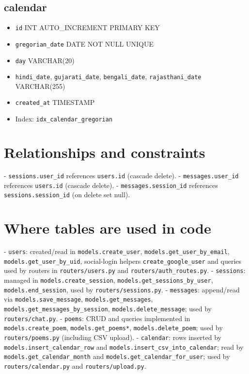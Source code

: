 \subsection*{calendar}
\begin{itemize}
  \item \texttt{id} INT AUTO\_INCREMENT PRIMARY KEY
  \item \texttt{gregorian\_date} DATE NOT NULL UNIQUE
  \item \texttt{day} VARCHAR(20)
  \item \texttt{hindi\_date}, \texttt{gujarati\_date}, \texttt{bengali\_date}, \texttt{rajasthani\_date} VARCHAR(255)
  \item \texttt{created\_at} TIMESTAMP
  \item Index: \texttt{idx\_calendar\_gregorian}
\end{itemize}

\section*{Relationships and constraints}
- \texttt{sessions.user\_id} references \texttt{users.id} (cascade delete).
- \texttt{messages.user\_id} references \texttt{users.id} (cascade delete).
- \texttt{messages.session\_id} references \texttt{sessions.session\_id} (on delete set null).

\section*{Where tables are used in code}
- \texttt{users}: created/read in \texttt{models.create\_user}, \texttt{models.get\_user\_by\_email}, \texttt{models.get\_user\_by\_uid}, social-login helpers \texttt{create\_google\_user} and queries used by routers in \texttt{routers/users.py} and \texttt{routers/auth\_routes.py}.
- \texttt{sessions}: managed in \texttt{models.create\_session}, \texttt{models.get\_sessions\_by\_user}, \texttt{models.end\_session}, used by \texttt{routers/sessions.py}.
- \texttt{messages}: append/read via \texttt{models.save\_message}, \texttt{models.get\_messages}, \texttt{models.get\_messages\_by\_session}, \texttt{models.delete\_message}; used by \texttt{routers/chat.py}.
- \texttt{poems}: CRUD and queries implemented in \texttt{models.create\_poem}, \texttt{models.get\_poems*}, \texttt{models.delete\_poem}; used by \texttt{routers/poems.py} (including CSV upload).
- \texttt{calendar}: rows inserted by \texttt{models.insert\_calendar\_row} and \texttt{models.insert\_csv\_into\_calendar}; read by \texttt{models.get\_calendar\_month} and \texttt{models.get\_calendar\_for\_user}; used by \texttt{routers/calendar.py} and \texttt{routers/upload.py}.

